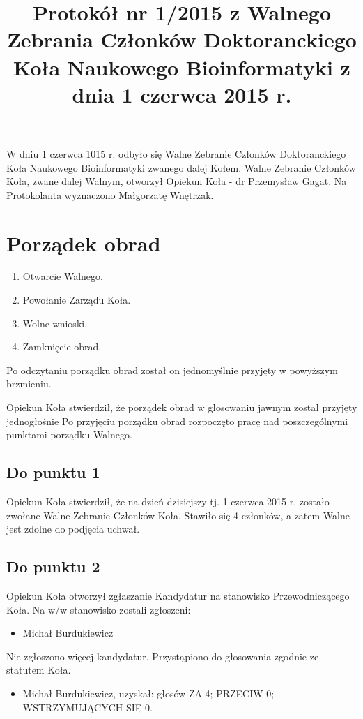 \documentclass{article}
\title{Protokół nr 1/2015 z Walnego Zebrania Członków Doktoranckiego Koła Naukowego Bioinformatyki z dnia 1 czerwca 2015 r.}
\date{}
\begin{document}
\maketitle

W dniu 1 czerwca 1015 r. odbyło się Walne Zebranie Członków Doktoranckiego Koła Naukowego Bioinformatyki zwanego dalej Kołem.
Walne Zebranie Członków Koła, zwane dalej Walnym, otworzył Opiekun Koła - dr Przemysław Gagat. Na Protokolanta wyznaczono Małgorzatę Wnętrzak. 


\section{Porządek obrad}
  \begin{enumerate}
    \item Otwarcie Walnego.
    \item Powołanie Zarządu Koła.
    \item Wolne wnioski.
    \item Zamknięcie obrad.
  \end{enumerate}

Po odczytaniu porządku obrad został on jednomyślnie przyjęty w powyższym brzmieniu.

Opiekun Koła stwierdził, że porządek obrad w głosowaniu jawnym został przyjęty jednogłośnie
Po przyjęciu porządku obrad rozpoczęto pracę nad poszczególnymi punktami porządku Walnego.

\subsection{Do punktu 1}
Opiekun Koła stwierdził, że na dzień dzisiejszy tj. 1 czerwca 2015 r. zostało zwołane Walne
Zebranie Członków Koła. Stawiło się 4 członków, a zatem Walne jest zdolne do podjęcia uchwał.


\subsection{Do punktu 2}
Opiekun Koła otworzył zgłaszanie Kandydatur na stanowisko Przewodniczącego
Koła. Na w/w stanowisko zostali zgłoszeni:
  \begin{itemize}
    \item Michał Burdukiewicz
  \end{itemize}

Nie zgłoszono więcej kandydatur. Przystąpiono do głosowania zgodnie ze statutem Koła.
  \begin{itemize}
    \item Michał Burdukiewicz, uzyskał: głosów ZA 4; PRZECIW 0; WSTRZYMUJĄCYCH SIĘ 0.
  \end{itemize}
  
\end{document}
